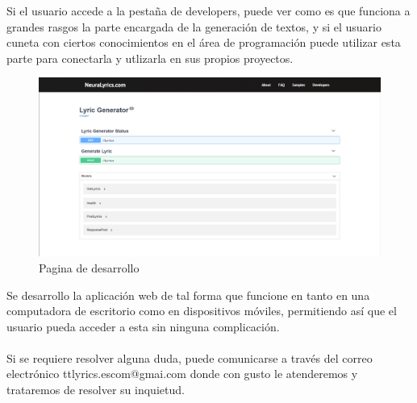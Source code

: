 \documentclass[12pt, a4paper, titlepage]{article}
\begin{document}
	Si el usuario accede a la pestaña de developers, puede ver como es que funciona a grandes rasgos la parte encargada de la generación de textos, y si el usuario cuneta con ciertos conocimientos en el área de programación puede utilizar esta parte para conectarla y utlizarla en sus propios proyectos.
	\begin{figure}[H] 
		\includegraphics[width=13.5cm]{./Imagenes/Capturas/pdev.png}
		\centering \caption{Pagina de desarrollo}
	\end{figure}
	Se desarrollo la aplicación web de tal forma que funcione en tanto en una computadora de escritorio como en dispositivos móviles, permitiendo así que el usuario pueda acceder a esta sin ninguna complicación.\\\\
	Si se requiere resolver alguna duda, puede comunicarse a través del correo electrónico ttlyrics.escom@gmai.com donde con gusto le atenderemos y trataremos de resolver su inquietud. 
	
	\begin{thebibliography}{20}
	\end{thebibliography}	
\end{document}
